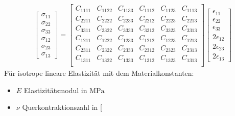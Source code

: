 \documentclass[letterpaper,10pt,german]{jupyterBook}
\begin{document}
\begin{equation}\label{equation:chapters/chapter1/elasticity:generalHook2}
\begin{split}\begin{bmatrix} 
\sigma_{11} \\
\sigma_{22} \\
\sigma_{33} \\
\sigma_{12} \\
\sigma_{23} \\
\sigma_{13} 
\end{bmatrix} = \begin{bmatrix}
C_{1111} & C_{1122} & C_{1133} & C_{1112} & C_{1123} & C_{1113} \\
C_{2211} & C_{2222} & C_{2233} & C_{2212} & C_{2223} & C_{2213} \\
C_{3311} & C_{3322} & C_{3333} & C_{3312} & C_{3323} & C_{3313} \\
C_{1211} & C_{1222} & C_{1233} & C_{1212} & C_{1223} & C_{1213} \\
C_{2311} & C_{2322} & C_{2333} & C_{2312} & C_{2323} & C_{2313} \\
C_{1311} & C_{1322} & C_{1333} & C_{1312} & C_{1323} & C_{1313} \\ 
\end{bmatrix} \begin{bmatrix} \epsilon_{11} \\ \epsilon_{22} \\ \epsilon_{33} \\ 2\epsilon_{12} \\ 2\epsilon_{23} \\ 2\epsilon_{13} \end{bmatrix}\end{split}
\end{equation}
\sphinxAtStartPar
Für isotrope lineare Elastizität mit dem Materialkonstanten:
\begin{itemize}
\item {} 
\sphinxAtStartPar
\(E\) \sphinxhyphen{} Elastizitätsmodul in \(\text{MPa}\)

\item {} 
\sphinxAtStartPar
\(\nu\) \sphinxhyphen{} Querkontraktionszahl in {[}\sphinxhyphen{}{]}

\end{itemize}
\end{document}
